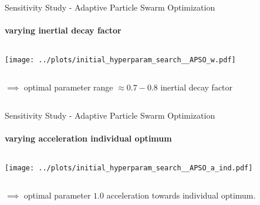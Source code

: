 \documentclass[11pt,aspectratio=169]{beamer}
\begin{document}
\begin{frame}{Sensitivity Study - Adaptive Particle Swarm Optimization}
    \framesubtitle{varying \textbf{inertial decay factor}}

    \begin{columns}
    \begin{column}{0.8\textwidth}
        \texttt{[image: ../plots/initial\_hyperparam\_search\_\_APSO\_w.pdf]}
    \end{column}
    \end{columns}

    \begin{columns}
        \begin{column}{0.8\textwidth}
            $\implies$ optimal parameter range $\approx 0.7 - 0.8$ inertial decay factor
        \end{column}
        \begin{column}{0.1\textwidth}
            \tiny{}
        \end{column}
    \end{columns}
\end{frame}

%
%

\begin{frame}{Sensitivity Study - Adaptive Particle Swarm Optimization}
    \framesubtitle{varying \textbf{acceleration individual optimum}}

    \begin{columns}
    \begin{column}{0.8\textwidth}
        \texttt{[image: ../plots/initial\_hyperparam\_search\_\_APSO\_a\_ind.pdf]}
    \end{column}
    \end{columns}

    \begin{columns}
        \begin{column}{0.8\textwidth}
            $\implies$ optimal parameter $1.0$ acceleration towards individual optimum.
        \end{column}
        \begin{column}{0.1\textwidth}
            \tiny{}
        \end{column}
    \end{columns}
\end{frame}

%
%
\end{document}
